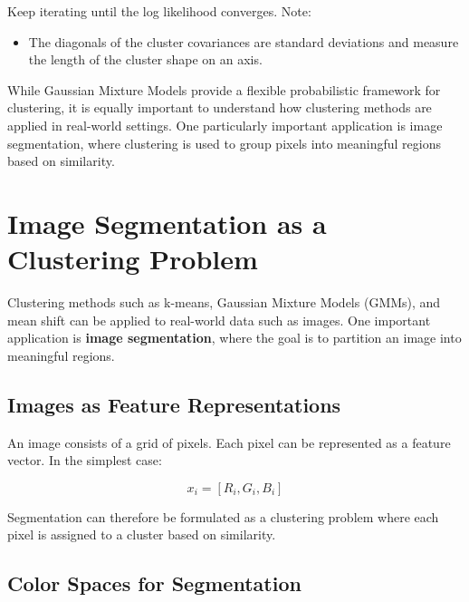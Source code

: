 \documentclass{article}
\begin{document}
Keep iterating until the log likelihood converges. Note:
\begin{itemize}
    \item The diagonals of the cluster covariances are standard deviations and measure the length of the cluster shape on an axis.
\end{itemize}

While Gaussian Mixture Models provide a flexible probabilistic framework for clustering, it is equally important to understand how clustering methods are applied in real-world settings. One particularly important application is image segmentation, where clustering is used to group pixels into meaningful regions based on similarity.

\section{Image Segmentation as a Clustering Problem}

Clustering methods such as k-means, Gaussian Mixture Models (GMMs), and mean shift can be applied to real-world data such as images. One important application is \textbf{image segmentation}, where the goal is to partition an image into meaningful regions.

\subsection{Images as Feature Representations}

An image consists of a grid of pixels. Each pixel can be represented as a feature vector. In the simplest case:

\[
x_i = [R_i, G_i, B_i]
\]

Segmentation can therefore be formulated as a clustering problem where each pixel is assigned to a cluster based on similarity.


\subsection{Color Spaces for Segmentation}
\end{document}
